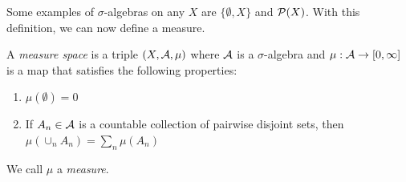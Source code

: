 Some examples of $\sigma$-algebras on any $X$ are $\{\emptyset, X\}$ and $\P(X)$. With this definition, we can now define a measure.

\begin{definition}
    A \emph{measure space} is a triple $(X, \cal{A}, \mu)$ where $\cal{A}$ is a $\sigma$-algebra and $\mu : \cal{A} \to [0, \infty]$ is a map that satisfies the following properties:
    \begin{enumerate}
        \item $\mu(\emptyset) = 0$
        \item If $A_n \in \cal{A}$ is a countable collection of pairwise disjoint sets, then $\mu(\cup_{n} A_n) = \sum_{n} \mu(A_n)$
    \end{enumerate}
    We call $\mu$ a \emph{measure}.
\end{definition}